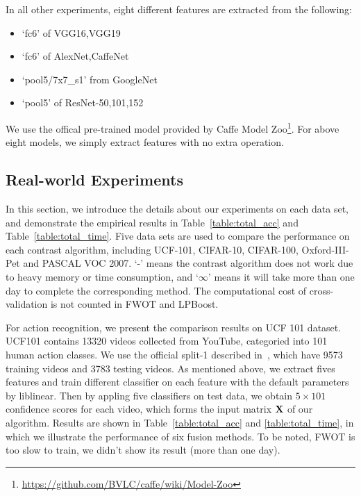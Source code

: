\documentclass[letterpaper]{article}
\def\bX{{\bf X}}
\def\bX{{\bf X}}
\begin{document}
In all other experiments, eight different features are extracted from the following:
\begin{itemize}
  \item `fc6' of VGG16,VGG19~\cite{chatfield2014return}
  \item `fc6' of AlexNet,CaffeNet~\cite{krizhevsky2012imagenet}
  \item `pool5/7x7\_s1' from GoogleNet~\cite{szegedy2015going}
  \item `pool5' of ResNet-50,101,152~\cite{he2015deep}
\end{itemize}
We use the offical pre-trained model provided by Caffe Model Zoo\footnote{\url{https://github.com/BVLC/caffe/wiki/Model-Zoo}}.
For above eight models, we simply extract features with no extra operation.





\subsection{Real-world Experiments}

In this section, we introduce the details about our experiments on each data set,
and demonstrate the empirical results in Table~\ref{table:total_acc} and Table~\ref{table:total_time}.
Five data sets are used to compare the performance on each contrast algorithm, including UCF-101, CIFAR-10, CIFAR-100, Oxford-III-Pet and PASCAL VOC 2007.
`-' means the contrast algorithm does not work due to heavy memory or time consumption,
and `$\infty$' means it will take more than one day to complete the corresponding method.
The computational cost of cross-validation is not counted in FWOT and LPBoost.

For action recognition, we present the comparison results on UCF 101 dataset.
UCF101 contains 13320 videos collected from YouTube, categoried into 101 human action classes.
We use the official split-1 described in~\cite{soomro2012ucf101}, which have 9573 training videos and 3783 testing videos.
As mentioned above, we extract fives features and train different classifier on each feature with the default parameters by liblinear.
Then by appling five classifiers on test data, we obtain $5 \times 101$ confidence scores for each video, which forms the input matrix $\bX$ of our algorithm.
Results are shown in Table~\ref{table:total_acc} and \ref{table:total_time}, in which we illustrate the performance of six fusion methods.
To be noted, FWOT is too slow to train, we didn't show its result (more than one day).
\end{document}
